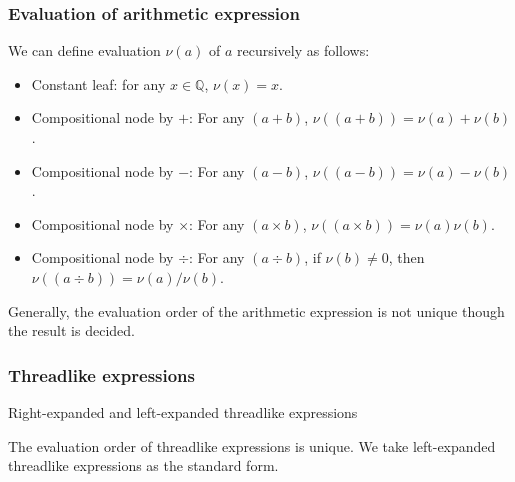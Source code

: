 \documentclass[aspectratio=169]{beamer}
\begin{document}
\begin{frame}
\frametitle{Evaluation of arithmetic expression}
We can define evaluation $\nu(a)$ of $a$ recursively as follows:
\begin{itemize}
  \item Constant leaf: for any $x \in \mathbb{Q}$, $\nu(x) = x$.
  \item Compositional node by $+$: For any $(a + b)$, $\nu((a + b)) = \nu(a) + \nu(b)$.
  \item Compositional node by $-$: For any $(a - b)$, $\nu((a - b)) = \nu(a) - \nu(b)$.
  \item Compositional node by $\times$: For any $(a \times b)$, $\nu((a \times b)) = \nu(a) \nu(b)$.
  \item Compositional node by $\div$: For any $(a \div b)$, if $\nu(b) \neq 0$, then $\nu((a \div b)) = \nu(a) / \nu(b)$.
\end{itemize}
Generally, the evaluation order of the arithmetic expression is not unique though the result is decided.
\end{frame}

\begin{frame}
    \frametitle{Threadlike expressions}
    Right-expanded and left-expanded threadlike expressions
    \begin{figure}[ht]
        \centering
    \end{figure}
    The evaluation order of threadlike expressions is unique. We take left-expanded threadlike expressions as the standard form.
\end{frame}
\end{document}
